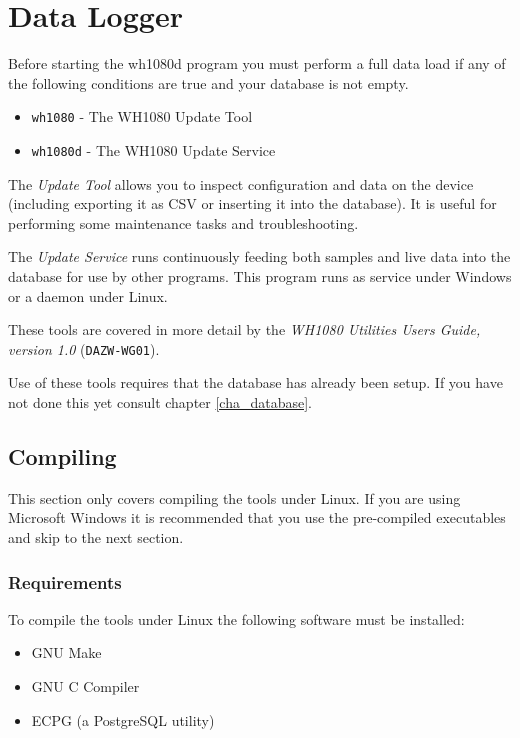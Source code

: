 \documentclass[a4paper,10pt,draft]{book}
\begin{document}

\chapter{Data Logger}

Before starting the wh1080d program you must perform a full data load if any of the following conditions are true and your database is not empty. 
\begin{itemize}
\item \verb|wh1080| - The WH1080 Update Tool
\item \verb|wh1080d| - The WH1080 Update Service
\end{itemize}

The \emph{Update Tool} allows you to inspect configuration and data on the device (including exporting it as CSV or inserting it into the database). It is useful for performing some maintenance tasks and troubleshooting.

The \emph{Update Service} runs continuously feeding both samples and live data into the database for use by other programs. This program runs as service under Windows or a daemon under Linux.

These tools are covered in more detail by the \emph{WH1080 Utilities Users Guide, version 1.0} (\verb|DAZW-WG01|).

Use of these tools requires that the database has already been setup. If you have not done this yet consult chapter \ref{cha_database}.

\section{Compiling}
This section only covers compiling the tools under Linux. If you are using Microsoft Windows it is recommended that you use the pre-compiled executables and skip to the next section.

\subsection{Requirements}
To compile the tools under Linux the following software must be installed:
\begin{itemize}
\item GNU Make
\item GNU C Compiler
\item ECPG (a PostgreSQL utility)
\end{itemize}
\end{document}
